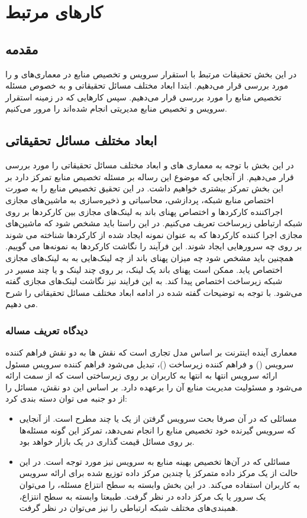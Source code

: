 
\chapter{کارهای مرتبط}

\section{مقدمه}
در این بخش تحقیقات مرتبط با استقرار سرویس و تخصیص منابع در معماری‌های   و  را مورد بررسی قرار می‌دهیم.
ابتدا ابعاد مختلف مسائل تحقیقاتی و به خصوص مسئله تخصیص منابع را مورد بررسی قرار می‌دهیم.
سپس کارهایی که در زمینه استقرار سرویس و تخصیص منابع مدیریتی انجام شده‌اند را مرور می‌کنیم.

\section{ابعاد مختلف مسائل تحقیقاتی}
در این بخش با توجه به معماری های  و  ابعاد مختلف مسائل تحقیقاتی را مورد بررسی قرار می‌دهیم.
از آنجایی که موضوع این رساله بر مسئله تخصیص منابع تمرکز دارد بر این بخش تمرکز بیشتری خواهیم داشت.
در این تحقیق تخصیص منابع را به صورت اختصاص منابع شبکه، پردازشی، محاسباتی و ذخیره‌سازی
به ماشین‌‌های مجازی اجراکننده کارکردها و اختصاص پهنای باند به لینک‌های مجازی بین کارکردها بر روی شبکه ارتباطی زیرساخت تعریف می‌کنیم.
در این راستا باید مشخص شود که ماشین‌های مجازی اجرا کننده کارکردها که به عنوان نمونه ایجاد شده از کارکردها شناخته می شوند
بر روی چه سرورهایی ایجاد شوند.
این فرآیند را نگاشت کارکردها به نمونه‌ها می گوییم.
همچنین باید مشخص شود چه میزان پهنای باند از چه لینک‌هایی به به لینک‌های مجازی اختصاص یابد.
ممکن است پهنای باند یک لینک، بر روی چند لینک و یا چند مسیر در شبکه زیرساخت اختصاص پیدا کند.
به این فرایند نیز نگاشت لینک‌های مجازی گفته می‌شود.
با توجه به توضیحات گفته شده در ادامه ابعاد مختلف مسائل تحقیقاتی را شرح می دهیم.

\subsection{دیدگاه تعریف مساله}
معماری آینده اینترنت بر اساس مدل تجاری  است که
نقش ‌ها به دو نقش فراهم کننده سرویس () و فراهم کننده زیرساخت ()، تبدیل می‌شود
فراهم کننده سرویس مسئول ارائه سرویس انتها به انتها به کاربران بر روی زیرساختی است که
از سمت  ارائه می‌شود و مسئولیت مدیریت منابع آن را برعهده دارد.
بر اساس این دو نقش، مسائل را از دو جنبه می توان دسته بندی کرد:

\begin{itemize}
    \item مسائلی که در آن صرفا بحث سرویس گرفتن از یک یا چند  مطرح است. از آنجایی که سرویس گیرنده خود تخصیص منابع را انجام نمی‌دهد، تمرکز این گونه مسئله‌ها بر روی مسائل قیمت گذاری در یک بازار  خواهد بود.
    \item مسائلی که در آن‌ها تخصیص بهینه منابع به سرویس نیز مورد توجه است. در این حالت  از یک مرکز داده متمرکز یا چندین مرکز داده توزیع شده برای ارائه سرویس به کاربران استفاده می‌کند. در این بخش وابسته به سطح  انتزاع مسئله،  را می‌توان یک سرور یا یک مرکز داده در نظر گرفت. طبیعتا وابسته به سطح انتزاع، همبندی‌‌های مختلف شبکه ارتباطی را نیز می‌توان در نظر گرفت.
\end{itemize}


